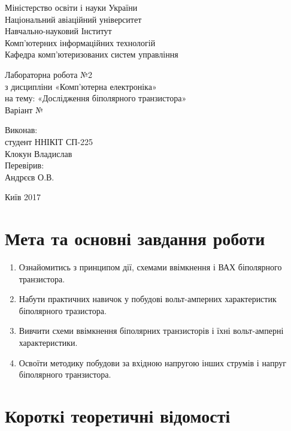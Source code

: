 \documentclass[a4paper,oneside,12pt,DIV=12,titlepage]{scrartcl}
\begin{document}
	\begin{titlepage}
		\begin{center}
			Міністерство освіти і науки України\\
			Національний авіаційний університет\\
			Навчально-науковий Інститут\\
			Комп'ютерних інформаційних технологій\\
			Кафедра комп'ютеризованих систем управління
			
			\vspace{\fill}
				Лабораторна робота №2\\
				з дисципліни «Комп'ютерна електроніка»\\
				на тему: «Дослідження біполярного транзистора»\\
				Варіант №
				
			\vspace{\fill}
			
			\begin{flushright}
				Виконав:\\
				студент ННІКІТ СП-225\\
				Клокун Владислав\\
				Перевірив:\\
				Андрєєв О.В.
			\end{flushright}
			Київ 2017
		\end{center}
	\end{titlepage}
	
	\tableofcontents
	\newpage
	
	\section{Мета та основні завдання роботи}
		\begin{enumerate}
			\item Ознайомитись з принципом дії, схемами ввімкнення і ВАХ біполярного транзистора.
			\item Набути практичних навичок у побудові вольт-амперних характеристик біполярного тразистора.
			\item Вивчити схеми ввімкнення біполярних транзисторів і їхні вольт-амперні характеристики.
			\item Освоїти методику побудови за вхідною напругою інших струмів і напруг біполярного транзистора.
		\end{enumerate}
	
	\section{Короткі теоретичні відомості}
\end{document}
